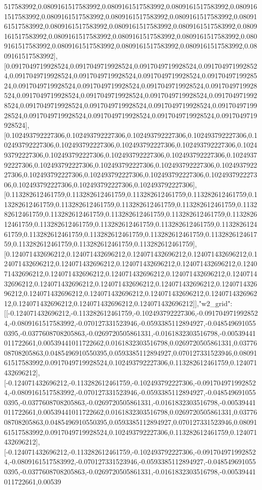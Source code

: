 \documentclass{article}
\begin{document}
517583992,0.0809161517583992,0.0809161517583992,0.0809161517583992,0.0809161517583992,0.0809161517583992,0.0809161517583992,0.0809161517583992,0.0809161517583992,0.0809161517583992,0.0809161517583992,0.0809161517583992,0.0809161517583992,0.0809161517583992,0.0809161517583992,0.0809161517583992,0.0809161517583992,0.0809161517583992,0.0809161517583992,0.0809161517583992,0.0809161517583992],[0.0917049719928524,0.0917049719928524,0.0917049719928524,0.0917049719928524,0.0917049719928524,0.0917049719928524,0.0917049719928524,0.0917049719928524,0.0917049719928524,0.0917049719928524,0.0917049719928524,0.0917049719928524,0.0917049719928524,0.0917049719928524,0.0917049719928524,0.0917049719928524,0.0917049719928524,0.0917049719928524,0.0917049719928524,0.0917049719928524,0.0917049719928524,0.0917049719928524,0.0917049719928524,0.0917049719928524],[0.102493792227306,0.102493792227306,0.102493792227306,0.102493792227306,0.102493792227306,0.102493792227306,0.102493792227306,0.102493792227306,0.102493792227306,0.102493792227306,0.102493792227306,0.102493792227306,0.102493792227306,0.102493792227306,0.102493792227306,0.102493792227306,0.102493792227306,0.102493792227306,0.102493792227306,0.102493792227306,0.102493792227306,0.102493792227306,0.102493792227306,0.102493792227306],[0.113282612461759,0.113282612461759,0.113282612461759,0.113282612461759,0.113282612461759,0.113282612461759,0.113282612461759,0.113282612461759,0.113282612461759,0.113282612461759,0.113282612461759,0.113282612461759,0.113282612461759,0.113282612461759,0.113282612461759,0.113282612461759,0.113282612461759,0.113282612461759,0.113282612461759,0.113282612461759,0.113282612461759,0.113282612461759,0.113282612461759,0.113282612461759],[0.124071432696212,0.124071432696212,0.124071432696212,0.124071432696212,0.124071432696212,0.124071432696212,0.124071432696212,0.124071432696212,0.124071432696212,0.124071432696212,0.124071432696212,0.124071432696212,0.124071432696212,0.124071432696212,0.124071432696212,0.124071432696212,0.124071432696212,0.124071432696212,0.124071432696212,0.124071432696212,0.124071432696212,0.124071432696212,0.124071432696212,0.124071432696212]],"w2_grid":[[-0.124071432696212,-0.113282612461759,-0.102493792227306,-0.0917049719928524,-0.0809161517583992,-0.070127331523946,-0.0593385112894927,-0.0485496910550395,-0.0377608708205863,-0.0269720505861331,-0.0161832303516798,-0.00539441011722661,0.00539441011722662,0.0161832303516798,0.0269720505861331,0.0377608708205863,0.0485496910550395,0.0593385112894927,0.070127331523946,0.0809161517583992,0.0917049719928524,0.102493792227306,0.113282612461759,0.124071432696212],[-0.124071432696212,-0.113282612461759,-0.102493792227306,-0.0917049719928524,-0.0809161517583992,-0.070127331523946,-0.0593385112894927,-0.0485496910550395,-0.0377608708205863,-0.0269720505861331,-0.0161832303516798,-0.00539441011722661,0.00539441011722662,0.0161832303516798,0.0269720505861331,0.0377608708205863,0.0485496910550395,0.0593385112894927,0.070127331523946,0.0809161517583992,0.0917049719928524,0.102493792227306,0.113282612461759,0.124071432696212],[-0.124071432696212,-0.113282612461759,-0.102493792227306,-0.0917049719928524,-0.0809161517583992,-0.070127331523946,-0.0593385112894927,-0.0485496910550395,-0.0377608708205863,-0.0269720505861331,-0.0161832303516798,-0.00539441011722661,0.00539
\end{document}
